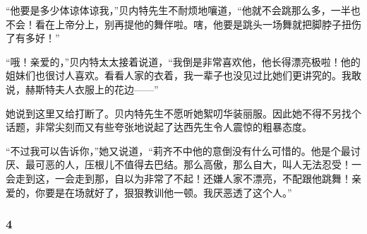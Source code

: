 \par “他要是多少体谅体谅我，”贝内特先生不耐烦地嚷道，“他就不会跳那么多，一半也不会！看在上帝分上，别再提他的舞伴啦。嗐，他要是跳头一场舞就把脚脖子扭伤了有多好！”
\par “哦！亲爱的，”贝内特太太接着说道，“我倒是非常喜欢他，他长得漂亮极啦！他的姐妹们也很讨人喜欢。看看人家的衣着，我一辈子也没见过比她们更讲究的。我敢说，赫斯特夫人衣服上的花边——”
\par 她说到这里又给打断了。贝内特先生不愿听她絮叨华装丽服。因此她不得不另找个话题，非常尖刻而又有些夸张地说起了达西先生令人震惊的粗暴态度。
\par “不过我可以告诉你，”她又说道，“莉齐不中他的意倒没有什么可惜的。他是个最讨厌、最可恶的人，压根儿不值得去巴结。那么高傲，那么自大，叫人无法忍受！一会走到这，一会走到那，自以为非常了不起！还嫌人家不漂亮，不配跟他跳舞！亲爱的，你要是在场就好了，狠狠教训他一顿。我厌恶透了这个人。”


\subsubsection*{4}


